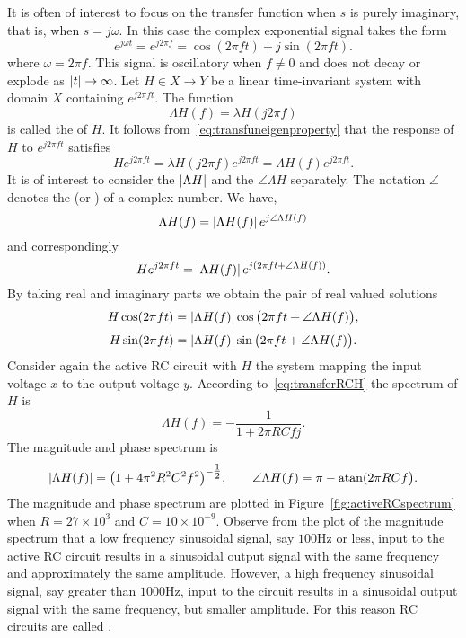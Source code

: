 It is often of interest to focus on the transfer function when $s$ is purely imaginary, that is, when $s = j \omega$.  In this case the complex exponential signal takes the form
\[
e^{j\omega t} = e^{j 2\pi f} = \cos( 2\pi f t) + j \sin( 2\pi f t).
\] 
where $\omega = 2\pi f$.  This signal is oscillatory when $f \neq 0$ and does not decay or explode as $\left\vert t \right\vert \rightarrow \infty$.  Let $H \in X \to Y$ be a linear time-invariant system with domain $X$ containing $e^{j 2\pi f t}$.  The function
\[
\Lambda H(f) = \lambda H( j 2\pi f )
\]
is called the  of $H$.  It follows from~\eqref{eq:transfuneigenproperty} that the response of $H$ to $e^{j2\pi ft}$ satisfies
\[
H e^{j 2\pi f t}  = \lambda H (j 2\pi f) e^{j 2\pi f t} = \Lambda H(f) e^{j 2\pi f t}. 
\]
It is of interest to consider the  $\left\vert \Lambda H \right\vert$ and the  $\angle{\Lambda H}$ separately.  The notation $\angle$ denotes the  (or ) of a complex number.  We have,
\[
\Lambda H(f) = \left\vert \Lambda H(f) \right\vert e^{j \angle{\Lambda H(f)}}
\]  
and correspondingly
\[
H e^{j 2\pi f t} = \left\vert \Lambda H(f) \right\vert e^{j ( 2\pi f t + \angle{\Lambda H(f)})}.
\]
By taking real and imaginary parts we obtain the pair of real valued solutions
\[
H\cos(2\pi f t) = \left\vert \Lambda H (f) \right\vert \cos\big(2\pi f t + \angle{\Lambda H(f)}\big),
\]
\begin{equation}\label{eq:spectrumrealvaluedsinsolution}
H \sin(2\pi f t)  = \left\vert \Lambda H(f) \right\vert \sin\big(2\pi f t + \angle{\Lambda H(f)}\big).
\end{equation}
Consider again the active RC circuit with $H$ the system mapping the input voltage $x$ to the output voltage $y$.  According to~\eqref{eq:transferRCH} the spectrum of $H$ is
\begin{equation}\label{eq:specactiveRC}
\Lambda H(f) = -\frac{1}{1 + 2 \pi RC f j}.
\end{equation}
The magnitude and phase spectrum is
\[
\left\vert \Lambda H(f) \right\vert = \big(1 + 4\pi^2 R^2 C^2 f^2\big)^{-\tfrac{1}{2}}, \qquad \angle \Lambda H(f) = \pi - \operatorname{atan}( 2\pi R C f \big).
\]
The magnitude and phase spectrum are plotted in Figure~\ref{fig:activeRCspectrum} when $R=27 \times 10^3$ and $C= 10 \times 10^{-9}$.  Observe from the plot of the magnitude spectrum that a low frequency sinusoidal signal, say $100\si{\hertz}$ or less, input to the active RC circuit results in a sinusoidal output signal with the same frequency and approximately the same amplitude.  However, a high frequency sinusoidal signal, say greater than $1000\si{\hertz}$, input to the circuit results in a sinusoidal output signal with the same frequency, but smaller amplitude.  For this reason RC circuits are called .

